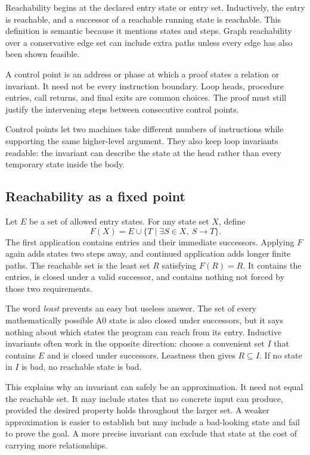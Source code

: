 Reachability begins at the declared entry state or entry set. Inductively, the
entry is reachable, and a successor of a reachable running state is reachable.
This definition is semantic because it mentions states and steps. Graph
reachability over a conservative edge set can include extra paths unless every
edge has also been shown feasible.

\begin{definition}[title={Control point}]
A control point is an address or phase at which a proof states a relation or
invariant. It need not be every instruction boundary. Loop heads, procedure
entries, call returns, and final exits are common choices. The proof must still
justify the intervening steps between consecutive control points.
\end{definition}

Control points let two machines take different numbers of instructions while
supporting the same higher-level argument. They also keep loop invariants
readable: the invariant can describe the state at the head rather than every
temporary state inside the body.

\subsection{Reachability as a fixed point}

Let \(E\) be a set of allowed entry states. For any state set \(X\), define
\[
 F(X)=E\mathbin{\cup}\{T\mid \exists S\in X,\ S\to T\}.
\]
The first application contains entries and their immediate successors. Applying
\(F\) again adds states two steps away, and continued application adds longer
finite paths. The reachable set is the least set \(R\) satisfying
\(F(R)=R\). It contains the entries, is closed under a valid successor, and
contains nothing not forced by those two requirements.

The word \emph{least} prevents an easy but useless answer. The set of every
mathematically possible A0 state is also closed under successors, but it says
nothing about which states the program can reach from its entry. Inductive
invariants often work in the opposite direction: choose a convenient set
\(I\) that contains \(E\) and is closed under successors. Leastness then gives
\(R\subseteq I\). If no state in \(I\) is bad, no reachable state is bad.

This explains why an invariant can safely be an approximation. It need not
equal the reachable set. It may include states that no concrete input can
produce, provided the desired property holds throughout the larger set. A
weaker approximation is easier to establish but may include a bad-looking
state and fail to prove the goal. A more precise invariant can exclude that
state at the cost of carrying more relationships.

